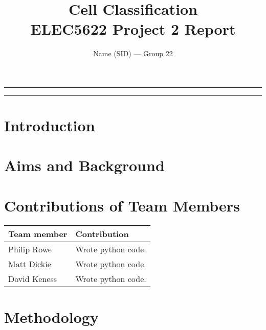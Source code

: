 \documentclass{article}
\title{\bfseries Cell Classification \\ \vspace{1.5em}
\large ELEC5622 Project 2 Report}
\author{Name (SID) --- Group 22}
\begin{document}
\rule{\textwidth}{1pt}

\begin{minipage}[h]{\textwidth}
    \sffamily\maketitle
\end{minipage}

\vspace{1.5em}

\rule{\textwidth}{1pt}

\vspace{1em}

{
    \centering

\thispagestyle{empty}

\newpage

{\large\tableofcontents}
\thispagestyle{empty}

}

\newpage

\setcounter{page}{1}

\section{Introduction}


\section{Aims and Background}


\section{Contributions of Team Members}

\begin{table}[!h]
    \begin{tabularx}{\linewidth}{l X}
        \toprule
        Team member & Contribution \\
        \midrule
        Philip Rowe & Wrote python code. \\
        Matt Dickie & Wrote python code. \\
        David Keness & Wrote python code. \\
        \bottomrule
    \end{tabularx}
\end{table}

\section{Methodology}
\end{document}
